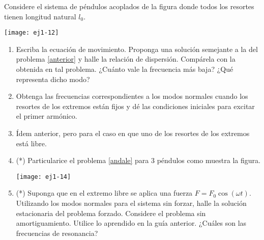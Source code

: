 \item
\begin{minipage}[t][2cm]{0.6\textwidth}
 Considere el sistema de péndulos acoplados de la figura donde todos los resortes tienen longitud natural $l_0$. 
\end{minipage}
\begin{minipage}[c][2cm][t]{0.35\textwidth}
  \texttt{[image: ej1-12]}
\end{minipage}
\begin{enumerate}
	\item Escriba la ecuación de movimiento.
	Proponga una solución semejante a la del problema \ref{anterior} y halle la relación de dispersión.
	Compárela con la obtenida en tal problema.
	¿Cuánto vale la frecuencia más baja?
	¿Qué representa dicho modo? 
	\item Obtenga las frecuencias correspondientes a los modos normales cuando los resortes de los extremos están fijos y dé las condiciones iniciales para excitar el primer armónico. 
	\item \label{andale} Ídem anterior, pero para el caso en que uno de los resortes de los extremos está libre.
	\item 
	\begin{minipage}[t][1.6cm]{0.7\textwidth}
	(*) Particularice el problema \ref{andale} para 3 péndulos como muestra la figura.
	\end{minipage}
	\begin{minipage}[c][2cm][t]{0.2\textwidth}
  	\texttt{[image: ej1-14]}
	\end{minipage}
	\item (*) Suponga que en el extremo libre se aplica una fuerza \(F = F_0 \cos(\omega t)\).
	Utilizando los modos normales para el sistema sin forzar, halle la solución estacionaria del problema forzado.
	Considere el problema sin amortiguamiento.
	Utilice lo aprendido en la guía anterior.
	¿Cuáles son las frecuencias de resonancia?
\end{enumerate}
